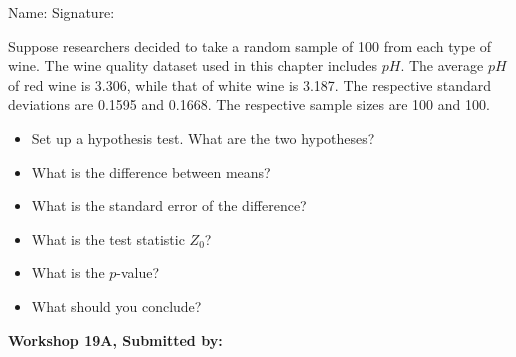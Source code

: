 \documentclass[11pt]{book}\usepackage[]{graphicx}\usepackage[]{color}
\begin{document}
\begin{exercises}
\begin{exercise}
\begin{center}
{{\vspace{4mm}
Name: \underline{\phantom{xxxxxxxxxxxxxxxxxxxxxxxx}} Signature: \underline{\phantom{xxxxxxxxxxxxxxxxxxxxxxxx}}
 }}
\end{center}   %

Suppose researchers decided to take a random sample of 100 from each type of wine.  The wine quality dataset used in this chapter includes $pH$. The average $pH$ of red wine is 3.306, while that of white wine is 3.187. The respective standard deviations are 0.1595 and 0.1668. The respective sample sizes are 100 and 100.

\begin{itemize}
  \item Set up a hypothesis test. What are the two hypotheses?
  \item What is the difference between means?
  \item What is the standard error of the difference?
  \item What is the test statistic $Z_0$?
  \item What is the $p$-value?
  \item What should you conclude?
\end{itemize}

\end{exercise}
\begin{solution}  %


\end{solution}


\clearpage

    \begin{exercise}  %

    \begin{center}
\begin{flushleft}\textbf{\large \hfill Workshop 19A, Submitted by: }\end{flushleft}


\end{center}
\end{exercise}
\end{exercises}
\end{document}

